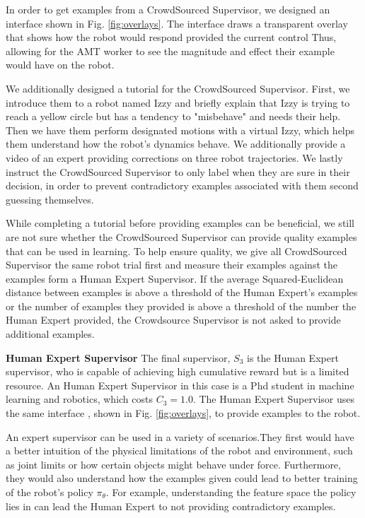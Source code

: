 \documentclass[10pt, conference]{ieeeconf}      %
\begin{document}
In order to get examples from a CrowdSourced Supervisor, we designed an interface shown in Fig. \ref{fig:overlays}. The interface draws a transparent overlay that shows how the robot would respond provided the current control Thus, allowing for the AMT worker to see the magnitude and effect their example would have on the robot.

We additionally designed a tutorial for the CrowdSourced Supervisor. First, we introduce them to a robot named Izzy and briefly explain that Izzy is trying to reach a yellow circle but has a tendency to "misbehave" and needs their help. Then we have them perform designated motions with a virtual Izzy, which helps them understand how the robot's dynamics behave. We additionally provide a video of an expert providing corrections on three robot trajectories. We lastly instruct the CrowdSourced Supervisor to only label when they are sure in their decision, in order to prevent contradictory examples associated with them second guessing themselves.  

While completing a tutorial before providing examples can be beneficial, we still are not sure whether the CrowdSourced Supervisor can provide quality examples that can be used in learning. To help ensure quality, we give all CrowdSourced Supervisor  the same robot trial first and measure their examples against the examples form a  Human Expert Supervisor. If the average Squared-Euclidean distance between examples is above a threshold of the Human Expert's examples or the number of examples they provided is above a threshold of the number the Human Expert provided, the Crowdsource Supervisor is not asked to provide additional examples.



\noindent \textbf{Human Expert Supervisor} The final supervisor, $S_3$ is the Human Expert supervisor, who is capable of achieving high cumulative reward but is a limited resource. An Human Expert Supervisor in this case is a Phd student in machine learning and robotics, which costs $C_3=1.0$. The Human Expert Supervisor uses the same interface , shown in Fig. \ref{fig:overlays}, to provide examples to the robot.  

An expert supervisor can be used in a variety of scenarios.They first would have a better intuition of the physical limitations of the robot and environment, such as joint limits or how certain objects might behave under force. Furthermore, they would also understand how the examples given could lead to better training of the robot's policy $\pi_\theta$. For example, understanding the feature space the policy lies in can lead the Human Expert to not providing contradictory examples. 
\end{document}
